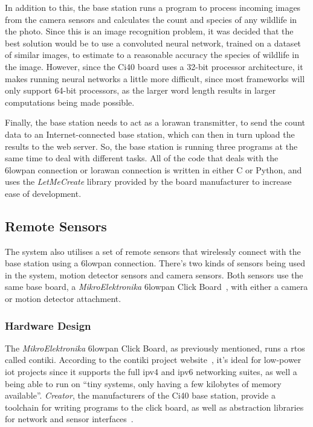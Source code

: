 In addition to this, the base station runs a program to process incoming
images from the camera sensors and calculates the count and species of any
wildlife in the photo. Since this is an image recognition problem, it was
decided that the best solution would be to use a convoluted neural network,
trained on a dataset of similar images, to estimate to a reasonable accuracy
the species of wildlife in the image. However, since the Ci40 board uses a
32-bit processor architecture, it makes running neural networks a little more
difficult, since most frameworks will only support 64-bit processors, as the
larger word length results in larger computations being made possible.

Finally, the base station needs to act as a \gls{lorawan} transmitter, to
send the count data to an Internet-connected base station, which can then in
turn upload the results to the web server. So, the base station is running
three programs at the same time to deal with different tasks. All of the code
that deals with the \gls{6lowpan} connection or \gls{lorawan} connection is
written in either C or Python, and uses the \textit{LetMeCreate} library
provided by the board manufacturer to increase ease of development.

\subsection{Remote Sensors}

The system also utilises a set of remote sensors that wirelessly connect with
the base station using a \gls{6lowpan} connection. There's two kinds of
sensors being used in the system, motion detector sensors and camera sensors.
Both sensors use the same base board, a \textit{MikroElektronika}
\gls{6lowpan} Click Board~\cite{mikroeclick}, with either a camera or motion
detector attachment.

\subsubsection{Hardware Design}

The \textit{MikroElektronika} \gls{6lowpan} Click Board, as previously
mentioned, runs a \acrfull{rtos} called \gls{contiki}. According to the
\gls{contiki} project website~\cite{contiki}, it's ideal for low-power
\acrshort{iot} projects since it supports the full \acrshort{ipv4} and
\acrshort{ipv6} networking suites, as well a being able to run on ``tiny
systems, only having a few kilobytes of memory available''. \textit{Creator},
the manufacturers of the Ci40 base station, provide a toolchain for writing
programs to the click board, as well as abstraction libraries for network and
sensor interfaces~\cite{letmecreate}.

